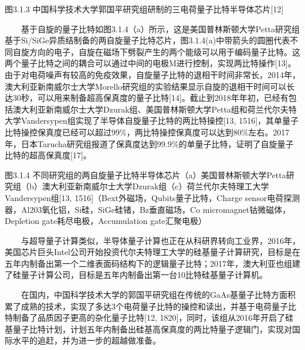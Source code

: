 \documentclass[a4paper,11pt,english]{sphinxmanual}
\begin{document}

\begin{center}图3.1.3 中国科学技术大学郭国平研究组研制的三电荷量子比特半导体芯片{[}12{]}
\end{center}
\sphinxAtStartPar
  基于自旋的量子比特如图3.1.4（a）所示，这是美国普林斯顿大学Petta研究组基于Si/SiGe异质结制备的两自旋量子比特芯片，图3.1.4(a)中带箭头的圆圈代表不同自旋方向的电子，自旋在磁场下劈裂产生的两个能级可以用于编码量子比特。这两个量子比特之间的耦合可以通过中间的电极M进行控制，实现两比特操作{[}13{]}。由于对电荷噪声有较高的免疫效果，自旋量子比特的退相干时间非常长，2014年，澳大利亚新南威尔士大学Morello研究组的实验结果显示自旋的退相干时间可以长达30秒，可以用来制备超高保真度的量子比特{[}14{]}。截止到2018年年初，已经有包括澳大利亚新南威尔士大学Dzurak组、美国普林斯顿大学Petta组和荷兰代尔夫特大学Vandersypen组实现了半导体自旋量子比特的两比特操控{[}13, 15\sphinxhyphen{}16{]}，其单量子比特操控保真度已经可以超过99\%，两比特操控保真度可以达到80\%左右。2017年，日本Tarucha研究组报道了保真度达到99.9\%的单量子比特，证明了自旋量子比特的超高保真度{[}17{]}。


\begin{center}图3.1.4 不同研究组的两自旋量子比特半导体芯片（a）美国普林斯顿大学Petta研究组（b）澳大利亚新南威尔士大学Dzurak组（c）荷兰代尔夫特理工大学Vandersypen组{[}13, 15\sphinxhyphen{}16{]}（Bext\sphinxhyphen{}外磁场，Qubits\sphinxhyphen{}量子比特，Charge sensor\sphinxhyphen{}电荷探测器，Al203\sphinxhyphen{}氧化铝，Si\sphinxhyphen{}硅，SiGe\sphinxhyphen{}硅锗，Bz\sphinxhyphen{}垂直磁场，Co micromagnet\sphinxhyphen{}钴微磁体，Depletion gate\sphinxhyphen{}耗尽电极，Accumulation gate\sphinxhyphen{}汇聚电极）
\end{center}
\sphinxAtStartPar
  与超导量子计算类似，半导体量子计算也正在从科研界转向工业界，2016年，美国芯片巨头Intel公司开始投资代尔夫特理工大学的硅基量子计算研究，目标是在五年内制备出第一个二维表面码结构下的逻辑量子比特；2017年，澳大利亚也组建了硅量子计算公司，目标是五年内制备出第一台10比特硅基量子计算机。

\sphinxAtStartPar
  在国内，中国科学技术大学的郭国平研究组在传统的GaAs基量子比特方面积累了成熟的技术，实现了多达3个电荷量子比特的操控和读出，并基于电荷量子比特制备了品质因子更高的杂化量子比特{[}12, 18\sphinxhyphen{}20{]}，同时，该组从2016年开启了硅基量子比特计划，计划五年内制备出硅基高保真度的两比特量子逻辑门，实现对国际水平的追赶，并为进一步的超越做准备。
\end{document}
